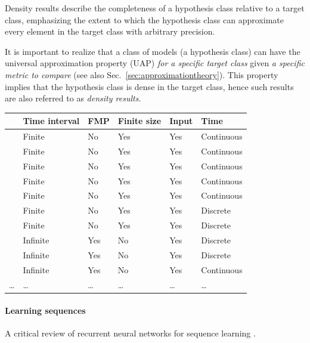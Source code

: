 \documentclass{article}
\theoremstyle{definition}
\theoremstyle{remark}
\begin{document}
Density results describe the completeness of a hypothesis class relative to a target class, emphasizing the extent to which the hypothesis class can approximate every element in the target class with arbitrary precision.


It is important to realize that a class of models (a hypothesis class) can have the universal approximation property (UAP) \emph{for a specific target class} given \emph{a specific metric to compare} (see also Sec.~\ref{sec:approximationtheory}).
This property implies that the hypothesis class is dense in the target class, hence such results are also referred to as \emph{density results}.

\begin{table}[h]
\begin{tabular}{|l|l|l|l|l|l|}
\cline{2-6}
    \multicolumn{1}{c|}{}							%
 						&  Time interval & FMP	& Finite size 		&  Input     	&     Time   \\\cline{2-6}\hline
\citet{cybenko1989approximation} 	& Finite	& No 	& Yes 			&  Yes		&	Continuous\\\hline  %
\citet{funahashi1989approximate} 	& Finite	& No		& Yes			&  Yes		&	Continuous\\\hline  %
\citet{hornik1989multilayer} 		& Finite	& No 	& Yes			& Yes		&	Continuous\\\hline  %
\citet{funahashi1993approximation} 	& Finite	& No		& Yes			&  Yes		&	Continuous\\\hline
\citet{jin1995approximation}		& Finite	& No		& Yes			& Yes		&	Continuous	\\\hline
\citet{hammer2000approximation}	& Finite     & No 	& Yes			& Yes		& 	Discrete	\\\hline
\citet{jin1995universal}			& Finite	& No		& Yes			& Yes		&	Discrete	\\\hline
\citet{bai2019deq} 				& Infinite	& Yes	& No		 	& Yes 			&	Discrete		\\\hline
\citet{schafer2007uap} 			& Infinite 	& Yes	& No			& Yes 			&	Discrete\\\hline
\citet{wang2024state}			& Infinite   & Yes 	& No 		& Yes			& 	Continuous\\\hline %
\dots&\dots &\dots&\dots&\dots&\dots\\
\end{tabular}
\end{table}


\paragraph{Learning sequences}
 A critical review of recurrent neural networks for sequence learning \citep{williams1989learning, pearlmutter1989learning, lipton2015rnn}.
 
\end{document}
